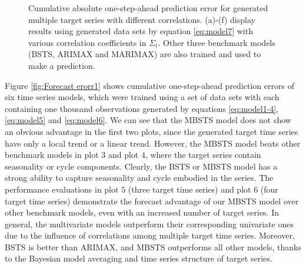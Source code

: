 \documentclass[twoside,11pt]{article}
\begin{document}
\begin{figure}[h]
	\caption{Cumulative absolute one-step-ahead prediction error for generated multiple target series with different correlations. (a)-(f) display results using generated data sets by equation \eqref{eq:model7} with various correlation coefficients in $\Sigma_t$. Other three benchmark models (BSTS, ARIMAX and MARIMAX) are also trained and used to make a prediction.}
	\label{fig:Forecast erorr2}
\end{figure}

Figure \ref{fig:Forecast erorr1} shows cumulative one-step-ahead prediction errors of six time series models, which were trained using a set of data sets with each containing one thousand observations generated by equations \eqref{eq:model1-4}, \eqref{eq:model5} and \eqref{eq:model6}. 
We can see that the MBSTS model does not show an obvious advantage in the first two plots, since the generated target time series have only a local trend or a linear trend.  
However, the MBSTS model beats other benchmark models in plot $3$ and plot $4$, where the target series contain seasonality or cycle components. Clearly, the BSTS or MBSTS model has a strong ability to capture seasonality and cycle embodied in the series. The performance evaluations in plot $5$ (three target time series) and plot $6$ (four target time series) demonstrate the forecast advantage of our MBSTS model over other benchmark models, even with an increased number of target series.
In general, the multivariate models outperform their corresponding univariate ones due to the influence of correlations among multiple target time series. Moreover, BSTS is better than ARIMAX, and MBSTS outperforms all other models, thanks to the Bayesian model averaging and time series structure of target series.
\end{document}

